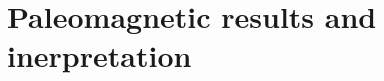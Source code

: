 \documentclass[draft]{agujournal2019}
\begin{document}


\section*{Paleomagnetic results and inerpretation}
\end{document}
